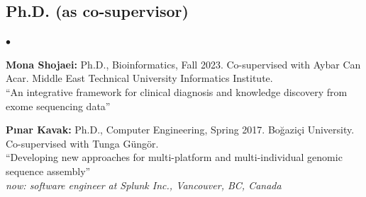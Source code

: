 \documentclass[margin,line]{res}
\newenvironment{list2}{
  \begin{list}{$\bullet$}{%
      \setlength{\itemsep}{0.1cm}
      \setlength{\parsep}{0in} \setlength{\parskip}{0in}
      \setlength{\topsep}{0in} \setlength{\partopsep}{0in} 
      \setlength{\leftmargin}{0.2in}}}{\end{list}}
\begin{document}
\begin{resume}
\vspace*{-.4cm}
\subsection{\small \sc Ph.D. (as co-supervisor)}
\begin{list2}
\item
{\bf Mona Shojaei:} Ph.D., Bioinformatics,  Fall 2023.
Co-supervised with Aybar Can Acar.
  Middle East Technical University Informatics Institute.\\
  ``An integrative framework for clinical diagnosis and knowledge discovery from exome sequencing data''

\item
  {\bf P{\i}nar Kavak:} Ph.D., Computer Engineering, Spring 2017.
  Bo\u{g}azi\c{c}i University. Co-supervised with Tunga G\"{u}ng\"{o}r.\\
  ``Developing new approaches for multi-platform and multi-individual genomic sequence assembly''\\
  {\it now: software engineer at Splunk Inc., Vancouver, BC, Canada}
\end{list2}

\vspace*{-.4cm}

\end{resume}
\end{document}
